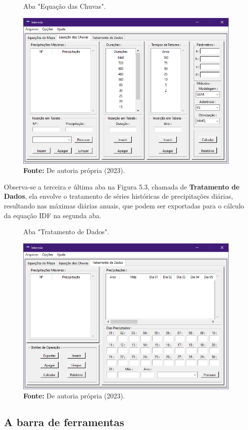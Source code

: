 \begin{figure}[!ht]
	\centering
	\caption{Aba "Equação das Chuvas".}
	\includegraphics[width=.7625\linewidth]{figuras/equacao_das_chuvas.png}
	\caption*{\textbf{Fonte:} De autoria própria (2023).}
	\label{fig:equacao_das_chuvas.png}
\end{figure}

Observa-se a terceira e última aba na Figura 5.3, chamada de \textbf{Tratamento de Dados}, ela envolve o tratamento de séries históricas de precipitações diárias, resultando nas máximas diárias anuais, que podem ser exportadas para o cálculo da equação IDF na segunda aba.\bigskip

\begin{figure}[!ht]
	\centering
	\caption{Aba "Tratamento de Dados".}
	\includegraphics[width=.7625\linewidth]{figuras/tratamento_de_dados.png}
	\caption*{\textbf{Fonte:} De autoria própria (2023).}
	\label{fig:tratamento_de_dados.png}
\end{figure}

\newpage

\subsection{A barra de ferramentas}

